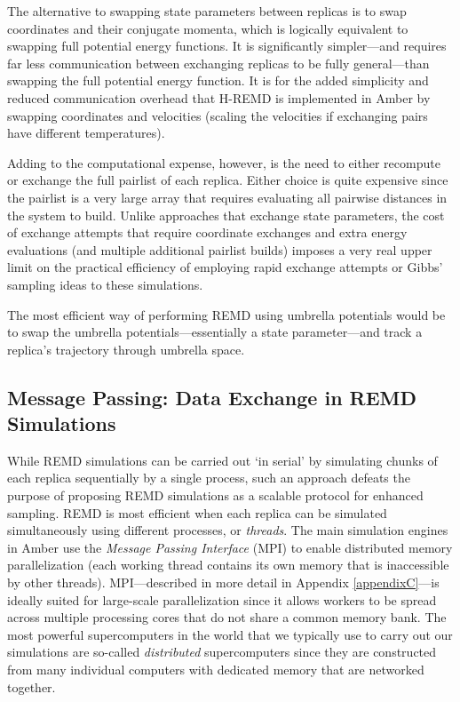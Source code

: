 The alternative to swapping state parameters between replicas is to swap
coordinates and their conjugate momenta, which is logically equivalent to
swapping full potential energy functions. It is significantly simpler---and
requires far less communication between exchanging replicas to be fully
general---than swapping the full potential energy function. It is for the added
simplicity and reduced communication overhead that H-REMD is implemented in
Amber by swapping coordinates and velocities (scaling the velocities if
exchanging pairs have different temperatures).
\cite{Meng_JChemTheoryComput_2011_v7_p2721}

Adding to the computational expense, however, is the need to either recompute or
exchange the full pairlist of each replica. Either choice is quite expensive
since the pairlist is a very large array that requires evaluating all pairwise
distances in the system to build. Unlike approaches that exchange state
parameters, the cost of exchange attempts that require coordinate exchanges and
extra energy evaluations (and multiple additional pairlist builds) imposes a
very real upper limit on the practical efficiency of employing rapid exchange
attempts or Gibbs' sampling ideas to these simulations.

The most efficient way of performing REMD using umbrella potentials would be to
swap the umbrella potentials---essentially a state parameter---and track a
replica's trajectory through umbrella space.

\subsection{Message Passing: Data Exchange in REMD Simulations}

While REMD simulations can be carried out `in serial' by simulating chunks of
each replica sequentially by a single process, such an approach defeats the
purpose of proposing REMD simulations as a scalable protocol for enhanced
sampling. REMD is most efficient when each replica can be simulated
simultaneously using different processes, or \emph{threads}. The main simulation
engines in Amber use the \emph{Message Passing Interface} (MPI) to enable
distributed memory parallelization (\ie each working thread contains its own
memory that is inaccessible by other threads). MPI---described in more detail in
Appendix \ref{appendixC}---is ideally suited for large-scale parallelization
since it allows workers to be spread across multiple processing cores that do
not share a common memory bank. The most powerful supercomputers in the world
that we typically use to carry out our simulations are so-called
\emph{distributed} supercomputers since they are constructed from many
individual computers with dedicated memory that are networked together.

